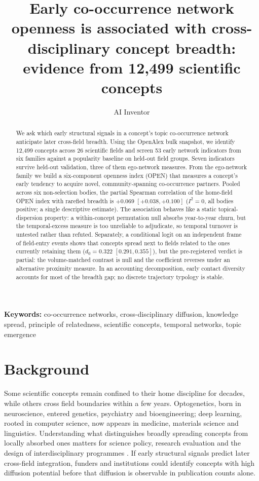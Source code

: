 \documentclass[11pt,letterpaper]{article}
\title{Early co-occurrence network openness is associated with cross-disciplinary concept breadth: evidence from 12,499 scientific concepts}
\author{AI Inventor}
\date{}
\begin{document}
\maketitle

\begin{abstract}
We ask which early structural signals in a concept's topic co-occurrence network anticipate later cross-field breadth. Using the OpenAlex bulk snapshot, we identify 12,499 concepts across 26 scientific fields and screen 53 early network indicators from six families against a popularity baseline on held-out field groups. Seven indicators survive held-out validation, three of them ego-network measures. From the ego-network family we build a six-component openness index (OPEN) that measures a concept's early tendency to acquire novel, community-spanning co-occurrence partners. Pooled across six non-selection bodies, the partial Spearman correlation of the home-field OPEN index with rarefied breadth is $+0.069$ $[+0.038, +0.100]$ ($I^2 = 0$, all bodies positive; a single descriptive estimate). The association behaves like a static topical-dispersion property: a within-concept permutation null absorbs year-to-year churn, but the temporal-excess measure is too unreliable to adjudicate, so temporal turnover is untested rather than refuted. Separately, a conditional logit on an independent frame of field-entry events shows that concepts spread next to fields related to the ones currently retaining them ($d_0 = 0.322$ $[0.291, 0.355]$), but the pre-registered verdict is partial: the volume-matched contrast is null and the coefficient reverses under an alternative proximity measure. In an accounting decomposition, early contact diversity accounts for most of the breadth gap; no discrete trajectory typology is stable.
\end{abstract}

\noindent\textbf{Keywords:} co-occurrence networks, cross-disciplinary diffusion, knowledge spread, principle of relatedness, scientific concepts, temporal networks, topic emergence


\section{Background}
\label{sec:background}

Some scientific concepts remain confined to their home discipline for decades, while others cross field boundaries within a few years. Optogenetics, born in neuroscience, entered genetics, psychiatry and bioengineering; deep learning, rooted in computer science, now appears in medicine, materials science and linguistics. Understanding what distinguishes broadly spreading concepts from locally absorbed ones matters for science policy, research evaluation and the design of interdisciplinary programmes \citep{Fortunato2018,Hofstra2019}. If early structural signals predict later cross-field integration, funders and institutions could identify concepts with high diffusion potential before that diffusion is observable in publication counts alone.
\end{document}
